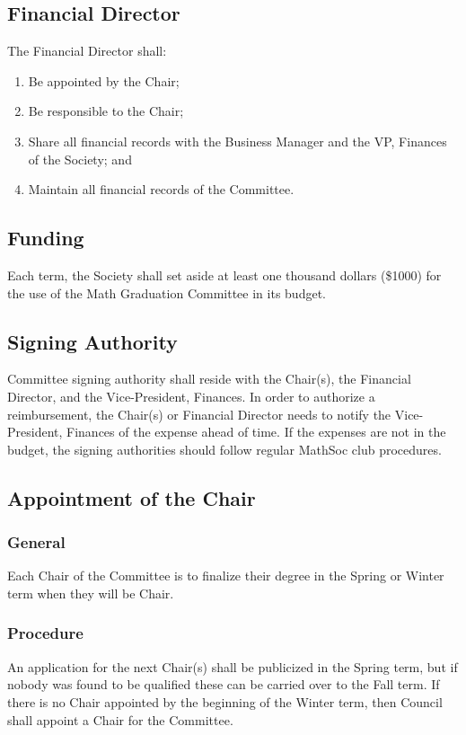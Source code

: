 \subsection{Financial Director}
The Financial Director shall:
\begin{enumerate}
\item Be appointed by the Chair;
\item Be responsible to the Chair;
\item Share all financial records with the Business Manager and the VP, Finances of 
the Society; and
\item Maintain all financial records of the Committee.
\end{enumerate}

\subsection{Funding}
Each term, the Society shall set aside at least one thousand dollars (\$1000) for the use of the Math Graduation Committee in its budget.

\subsection{Signing Authority}
Committee signing authority shall reside with the Chair(s), the Financial Director, 
and the Vice-President, Finances. In order to authorize a reimbursement, the Chair(s) 
or Financial Director needs to notify the Vice-President, Finances of the expense 
ahead of time. If the expenses are not in the budget, the signing authorities should 
follow regular MathSoc club procedures. 

\subsection{Appointment of the Chair}
\subsubsection{General}
Each Chair of the Committee is to finalize their degree in the Spring or Winter term 
when they will be Chair.

\subsubsection{Procedure}
An application for the next Chair(s) shall be publicized in the Spring term, but if 
nobody was found to be qualified these can be carried over to the Fall term. If there 
is no Chair appointed by the beginning of the Winter term, then Council shall appoint 
a Chair for the Committee.

